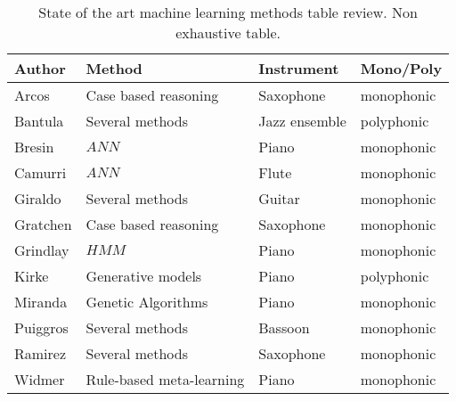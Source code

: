 \begin{table}[ht!]
\centering
  \caption[State of the art machine learning methods table review.]{State of the art machine learning methods table review. Non exhaustive table.}
  \label{tab:sota_ml}
  \begin{tabular}{  l l l l }
    \hline
	Author & Method & Instrument & Mono/Poly \\ \hline
    Arcos & Case based reasoning & Saxophone & monophonic\\
    Bantula & Several methods & Jazz ensemble & polyphonic \\
    Bresin & $ANN$ & Piano & monophonic\\
    Camurri & $ANN$ & Flute & monophonic\\
    Giraldo & Several methods & Guitar & monophonic \\
    Gratchen & Case based reasoning & Saxophone & monophonic \\
    Grindlay & $HMM$ & Piano & monophonic\\
    Kirke & Generative models & Piano & polyphonic \\
    Miranda & Genetic Algorithms & Piano & monophonic\\
    Puiggros & Several methods & Bassoon & monophonic \\
    Ramirez & Several methods & Saxophone & monophonic \\
    Widmer & Rule-based meta-learning & Piano & monophonic\\
 
    
    \hline
  \end{tabular}

\end{table}
